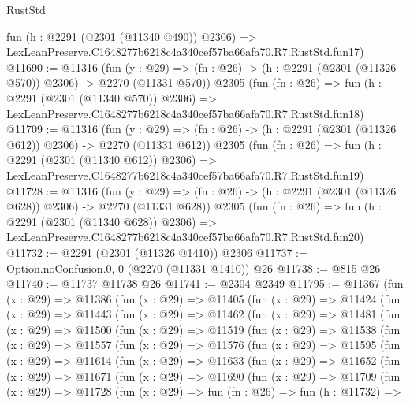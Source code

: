 \begin{lexlean}{RustStd}
\begin{coremodule}
    fun (h : @2291 (@2301 (@11340 @490)) @2306) =>
    LexLeanPreserve.C1648277b6218c4a340cef57ba66afa70.R7.RustStd.fun17)
@11690 := @11316
    (fun (y : @29) => (fn : @26) -> (h : @2291 (@2301 (@11326 @570)) @2306) -> @2270 (@11331 @570))
    @2305
    (fun (fn : @26) =>
    fun (h : @2291 (@2301 (@11340 @570)) @2306) =>
    LexLeanPreserve.C1648277b6218c4a340cef57ba66afa70.R7.RustStd.fun18)
@11709 := @11316
    (fun (y : @29) => (fn : @26) -> (h : @2291 (@2301 (@11326 @612)) @2306) -> @2270 (@11331 @612))
    @2305
    (fun (fn : @26) =>
    fun (h : @2291 (@2301 (@11340 @612)) @2306) =>
    LexLeanPreserve.C1648277b6218c4a340cef57ba66afa70.R7.RustStd.fun19)
@11728 := @11316
    (fun (y : @29) => (fn : @26) -> (h : @2291 (@2301 (@11326 @628)) @2306) -> @2270 (@11331 @628))
    @2305
    (fun (fn : @26) =>
    fun (h : @2291 (@2301 (@11340 @628)) @2306) =>
    LexLeanPreserve.C1648277b6218c4a340cef57ba66afa70.R7.RustStd.fun20)
@11732 := @2291 (@2301 (@11326 @1410)) @2306
@11737 := Option.noConfusion.{0, 0} (@2270 (@11331 @1410)) @26
@11738 := @815 @26
@11740 := @11737 @11738 @26
@11741 := @2304 @2349
@11795 := @11367
    (fun (x : @29) =>
    @11386
      (fun (x : @29) =>
      @11405
        (fun (x : @29) =>
        @11424
          (fun (x : @29) =>
          @11443
            (fun (x : @29) =>
            @11462
              (fun (x : @29) =>
              @11481
                (fun (x : @29) =>
                @11500
                  (fun (x : @29) =>
                  @11519
                    (fun (x : @29) =>
                    @11538
                      (fun (x : @29) =>
                      @11557
                        (fun (x : @29) =>
                        @11576
                          (fun (x : @29) =>
                          @11595
                            (fun (x : @29) =>
                            @11614
                              (fun (x : @29) =>
                              @11633
                                (fun (x : @29) =>
                                @11652
                                  (fun (x : @29) =>
                                  @11671
                                    (fun (x : @29) =>
                                    @11690
                                      (fun (x : @29) =>
                                      @11709
                                        (fun (x : @29) =>
                                        @11728
                                          (fun (x : @29) =>
                                          fun (fn : @26) =>
                                          fun (h : @11732) =>

\end{coremodule}
\end{lexlean}
